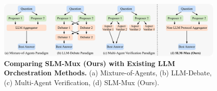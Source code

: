 \begin{figure}[t!]
    \centering
    \includegraphics[width=\textwidth]{Figures/comparison_v3.pdf}
    \vspace{-10.5pt}
    \caption{\small \textbf{Comparing SLM-Mux (Ours) with Existing LLM Orchestration Methods.} (a) Mixture-of-Agents, (b) LLM-Debate, (c) Multi-Agent Verification, (d) SLM-Mux (Ours).}
    
    \label{fig:comparison-methods}
\end{figure}





